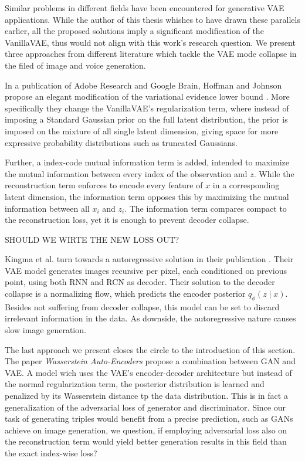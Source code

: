 Similar problems in different fields have been encountered for generative VAE applications. While the author of this thesis whishes to have drawn these parallels earlier, all the proposed solutions imply a significant modification of the VanillaVAE, thus would not align with this work's research question. We present three approaches from different literature which tackle the VAE mode collapse in the filed of image and voice generation.

In a publication of Adobe Research and Google Brain, Hoffman and Johnson propose an elegant modification of the variational evidence lower bound \cite{hoffman2016elbo}. 
More specifically they change the VanillaVAE's regularization term, where instead of imposing a Standard Gaussian prior on the full latent distribution, the prior is imposed on the mixture of all single latent dimension, giving space for more expressive probability distributions such as truncated Gaussians. 

Further, a index-code mutual information term is added, intended to maximize the mutual information between every index of the observation and $z$. While the reconstruction term enforces to encode every feature of $x$ in a corresponding latent dimension, the  information term opposes this by maximizing the mutual information between all  $x_i$ and $z_i$. The information term compares compact to the reconstruction loss, yet it is enough to prevent decoder collapse. 

SHOULD WE WIRTE THE NEW LOSS OUT?


Kingma et al. turn towards a autoregressive solution in their publication \cite{chen_variational_2017}. Their VAE model generates images recursive per pixel, each conditioned on previous point, using both RNN and RCN as decoder. Their solution to the decoder collapse is a normalizing flow, which predicts the encoder posterior $q_{\phi}(z \mid x)$. Besides not suffering from decoder collapse, this model can be set to discard irrelevant information in the data. As downside, the autoregressive nature causes slow image generation.


The last approach we present closes the circle to the introduction of this section. The paper \textit{Wasserstein Auto-Encoders} \cite{tolstikhin_wasserstein_2019} propose a combination between GAN and VAE. A model wich uses the VAE's encoder-decoder architecture but instead of the normal regularization term, the posterior distribution is learned and penalized by its Wasserstein distance tp the data distribution. This is in fact a generalization of the adversarial loss of generator and discriminator. Since our task of generating triples would benefit from a precise prediction, such as GANs achieve on image generation, we question, if employing adversarial loss also on the reconstruction term would yield better generation results in this field than the exact index-wise loss?

